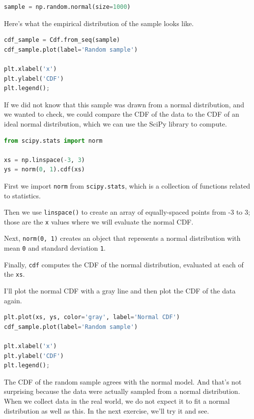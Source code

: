 \begin{lstlisting}[language=Python,style=source]
sample = np.random.normal(size=1000)
\end{lstlisting}

Here's what the empirical distribution of the sample looks like.

\begin{lstlisting}[language=Python,style=source]
cdf_sample = Cdf.from_seq(sample)
cdf_sample.plot(label='Random sample')

plt.xlabel('x')
plt.ylabel('CDF')
plt.legend();
\end{lstlisting}

If we did not know that this sample was drawn from a normal
distribution, and we wanted to check, we could compare the CDF of the
data to the CDF of an ideal normal distribution, which we can use the
SciPy library to compute.

\begin{lstlisting}[language=Python,style=source]
from scipy.stats import norm

xs = np.linspace(-3, 3)
ys = norm(0, 1).cdf(xs)
\end{lstlisting}

First we import \passthrough{\lstinline!norm!} from
\passthrough{\lstinline!scipy.stats!}, which is a collection of
functions related to statistics.

Then we use \passthrough{\lstinline!linspace()!} to create an array of
equally-spaced points from -3 to 3; those are the
\passthrough{\lstinline!x!} values where we will evaluate the normal
CDF.

Next, \passthrough{\lstinline!norm(0, 1)!} creates an object that
represents a normal distribution with mean \passthrough{\lstinline!0!}
and standard deviation \passthrough{\lstinline!1!}.

Finally, \passthrough{\lstinline!cdf!} computes the CDF of the normal
distribution, evaluated at each of the \passthrough{\lstinline!xs!}.

I'll plot the normal CDF with a gray line and then plot the CDF of the
data again.

\begin{lstlisting}[language=Python,style=source]
plt.plot(xs, ys, color='gray', label='Normal CDF')
cdf_sample.plot(label='Random sample')

plt.xlabel('x')
plt.ylabel('CDF')
plt.legend();
\end{lstlisting}

The CDF of the random sample agrees with the normal model. And that's
not surprising because the data were actually sampled from a normal
distribution. When we collect data in the real world, we do not expect
it to fit a normal distribution as well as this. In the next exercise,
we'll try it and see.

